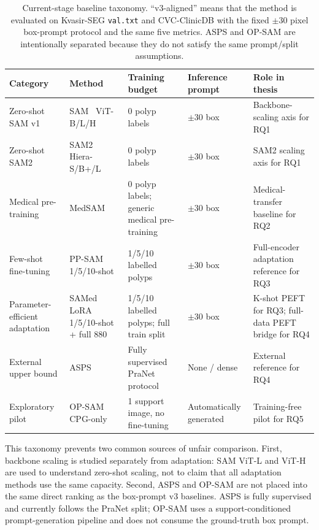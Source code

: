 \begin{table}[H]
\centering
\caption{Current-stage baseline taxonomy. ``v3-aligned'' means that the method is evaluated on Kvasir-SEG \texttt{val.txt} and CVC-ClinicDB with the fixed $\pm30$ pixel box-prompt protocol and the same five metrics. ASPS and OP-SAM are intentionally separated because they do not satisfy the same prompt/split assumptions.}
\label{tab:baseline-taxonomy}
\begin{tabular}{p{3.1cm}p{3.2cm}p{2.6cm}p{2.5cm}p{3.3cm}}
\toprule
\textbf{Category} & \textbf{Method} & \textbf{Training budget} & \textbf{Inference prompt} & \textbf{Role in thesis} \\
\midrule
Zero-shot SAM v1 & SAM~\cite{kirillov2023sam} ViT-B/L/H & 0 polyp labels & $\pm30$ box & Backbone-scaling axis for RQ1 \\
Zero-shot SAM2 & SAM2~\cite{ravi2024sam2} Hiera-S/B+/L & 0 polyp labels & $\pm30$ box & SAM2 scaling axis for RQ1 \\
Medical pre-training & MedSAM~\cite{ma2024medsam} & 0 polyp labels; generic medical pre-training & $\pm30$ box & Medical-transfer baseline for RQ2 \\
Few-shot fine-tuning & PP-SAM~\cite{rahman2024ppsam} 1/5/10-shot & 1/5/10 labelled polyps & $\pm30$ box & Full-encoder adaptation reference for RQ3 \\
Parameter-efficient adaptation & SAMed~\cite{zhang2023samed} LoRA 1/5/10-shot + full 880 & 1/5/10 labelled polyps; full train split & $\pm30$ box & K-shot PEFT for RQ3; full-data PEFT bridge for RQ4 \\
External upper bound & ASPS~\cite{li2024asps} & Fully supervised PraNet protocol & None / dense & External reference for RQ4 \\
Exploratory pilot & OP-SAM~\cite{li2025opsam} CPG-only & 1 support image, no fine-tuning & Automatically generated & Training-free pilot for RQ5 \\
\bottomrule
\end{tabular}
\end{table}

This taxonomy prevents two common sources of unfair comparison. First, backbone scaling is studied separately from adaptation: SAM ViT-L and ViT-H are used to understand zero-shot scaling, not to claim that all adaptation methods use the same capacity. Second, ASPS and OP-SAM are not placed into the same direct ranking as the box-prompt v3 baselines. ASPS is fully supervised and currently follows the PraNet split; OP-SAM uses a support-conditioned prompt-generation pipeline and does not consume the ground-truth box prompt.

